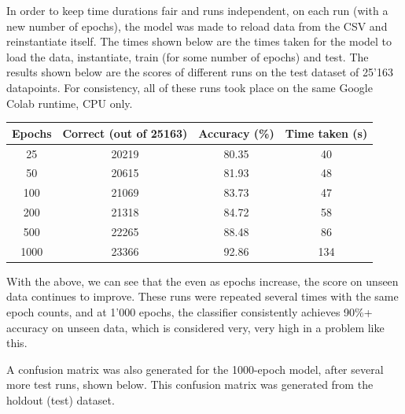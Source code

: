 \documentclass[a4paper, oneside, 11pt]{article}
\begin{document}
\bigskip
\noindent
In order to keep time durations fair and runs independent, on each run (with a new number of epochs), the model was made to reload data from the CSV and reinstantiate itself. The times shown below are the times taken for the model to load the data, instantiate, train (for some number of epochs) and test. The results shown below are the scores of different runs on the test dataset of 25'163 datapoints. For consistency, all of these runs took place on the same Google Colab runtime, CPU only. 

\bigskip
\begin{center}
\begin{tabular}{|c c c c|} 
 \hline
 \textbf{Epochs}   & \textbf{Correct (out of 25163)}  & \textbf{Accuracy (\%) } & \textbf{Time taken (s)} \\ [0.5ex] 
 \hline
 25 & 20219 & 80.35 & 40 \\ 
 \hline
 50 & 20615 & 81.93 & 48 \\
 \hline
 100 & 21069 & 83.73 & 47 \\
 \hline
 200 & 21318 & 84.72 & 58 \\ 
 \hline
 500 & 22265 & 88.48 & 86 \\ 
 \hline
 1000 & 23366 & 92.86 & 134 \\ 
 \hline
\end{tabular}
\end{center}

\bigskip
\noindent
With the above, we can see that the even as epochs increase, the score on unseen data continues to improve. These runs were repeated several times with the same epoch counts, and at 1'000 epochs, the classifier consistently achieves 90\%+ accuracy on unseen data, which is considered very, very high in a problem like this.

\bigskip
\noindent
A confusion matrix was also generated for the 1000-epoch model, after several more test runs, shown below. This confusion matrix was generated from the holdout (test) dataset.
\end{document}
